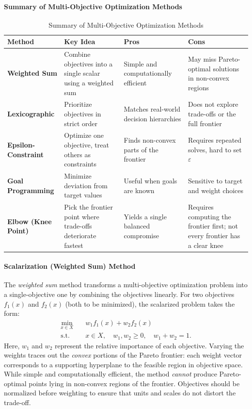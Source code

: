 \paragraph{Summary of Multi-Objective Optimization Methods}

\begin{table}[h]
\centering
\caption{Summary of Multi-Objective Optimization Methods}
\label{tab:moo-methods}
\renewcommand{\arraystretch}{1.3}
\begin{tabular}{|l|p{4.2cm}|p{3.5cm}|p{3.5cm}|}
\hline
\textbf{Method} & \textbf{Key Idea} & \textbf{Pros} & \textbf{Cons} \\
\hline
\textbf{Weighted Sum} & Combine objectives into a single scalar using a weighted sum & Simple and computationally efficient & May miss Pareto-optimal solutions in non-convex regions \\
\hline
\textbf{Lexicographic} & Prioritize objectives in strict order & Matches real-world decision hierarchies & Does not explore trade-offs or the full frontier \\
\hline
\textbf{Epsilon-Constraint} & Optimize one objective, treat others as constraints & Finds non-convex parts of the frontier & Requires repeated solves, hard to set $\varepsilon$ \\
\hline
\textbf{Goal Programming} & Minimize deviation from target values & Useful when goals are known & Sensitive to target and weight choices \\
\hline
\textbf{Elbow (Knee Point)} & Pick the frontier point where trade-offs deteriorate fastest & Yields a single balanced compromise & Requires computing the frontier first; not every frontier has a clear knee \\
\hline
\end{tabular}
\end{table}

\paragraph{Scalarization (Weighted Sum) Method}
The \emph{weighted sum} method transforms a multi-objective optimization problem into a single-objective one by combining the objectives linearly.
For two objectives $f_1(x)$ and $f_2(x)$ (both to be minimized), the scalarized problem takes the form:
\begin{align*}
\min_{x \in X} \quad & w_1 f_1(x) + w_2 f_2(x) \\
\text{s.t.} \quad & x \in X, \quad w_1, w_2 \ge 0, \quad w_1 + w_2 = 1.
\end{align*}
Here, $w_1$ and $w_2$ represent the relative importance of each objective. Varying the weights traces out the \emph{convex} portions of the Pareto frontier: each weight vector corresponds to a supporting hyperplane to the feasible region in objective space.
While simple and computationally efficient, the method \emph{cannot} produce Pareto-optimal points lying in non-convex regions of the frontier. Objectives should be normalized before weighting to ensure that units and scales do not distort the trade-off.

